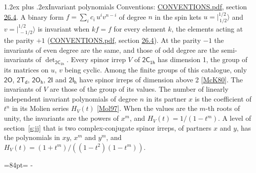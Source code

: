 \documentclass[10pt,a4paper]{article}
\makeatletter
\renewcommand\section{\@startsection{section}{1}{\z@}{-3ex plus -1ex minus -.2ex}%
  {1.2ex plus .2ex}{\normalfont\large\sffamily\bfseries\color{parttitle}}}
\newcommand{\needspace}[1]{\par\penalty-100\begingroup\dimen0=#1\relax\dimen2=\pagegoal
  \advance\dimen2-\pagetotal\ifdim\dimen0>\dimen2\relax\ifdim\dimen2>0pt\vfil\break\fi\fi
  \endgroup}
\numberwithin{equation}{section}
\newcommand{\grp}[1]{\mathsf{#1}}
\newcommand{\jm}[2]{\bigl\lvert{}^{#1}_{\,#2}\bigr\rangle}
\makeatother
\begin{document}
\section{Invariant polynomials}\label{s:invariants}
Conventions: \href{../../CONVENTIONS.pdf}{CONVENTIONS.pdf}, section \href{../../CONVENTIONS.pdf\#conv.26.4}{26.4}.
\leavevmode\label{n:local.binary.form}A binary form $f = \sum_i c_i\, u^i v^{n-i}$ of degree $n$ in the spin kets $u = \jm{1/2}{1/2}$ and $v = \jm{1/2}{-1/2}$ is invariant when $k f = f$ for every element $k$, the elements acting at the parity $+1$ (\href{../../CONVENTIONS.pdf}{CONVENTIONS.pdf}, section \href{../../CONVENTIONS.pdf\#conv.26.4}{26.4}). At the parity $-1$ the invariants of even degree are the same, and those of odd degree are the semi-invariants of $\det_{\grp{2C_{1h}}}$.
\leavevmode\label{n:function.hilbert}Every spinor irrep $V$ of $\grp{2C_{1h}}$ has dimension 1, the group of its matrices on $u$, $v$ being cyclic. Among the finite groups of this catalogue, only $\grp{2O}$, $\grp{2T_{d}}$, $\grp{2O_{h}}$, $\grp{2I}$ and $\grp{2I_{h}}$ have spinor irreps of dimension above 2 [\href{../../../REFERENCES.pdf\#ref.McK80}{McK80}]. The invariants of $V$ are those of the group of its values. \label{n:local.partner.x}The number of linearly independent invariant polynomials of degree $n$ in its partner $x$ is the coefficient of $t^n$ in its Molien series $H_V(t)$ [\href{../../../REFERENCES.pdf\#ref.Mol97}{Mol97}]. When the values are the $m$-th roots of unity, the invariants are the powers of $x^{m}$, and $H_V(t) = 1/(1 - t^{m})$. A level of section~\ref{s:jj} that is two complex-conjugate spinor irreps, of partners $x$ and $y$, has the polynomials in $xy$, $x^{m}$ and $y^{m}$, and $H_V(t) = (1 + t^{m})/((1 - t^{2})(1 - t^{m}))$.
\needspace{84pt}
\end{document}
